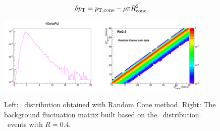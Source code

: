 \begin{equation}
\delta p_{\rm T} = p_{\rm T, cone} - \rho \pi R_{\rm cone}^{2}
\label{edeltapt}
\end{equation}

\begin{figure}[bth]
\centering
\includegraphics[width=0.45\textwidth]{pPbplots/ResponseMatrix/DeltaPt_Djet5Excl}
\includegraphics[width=0.45\textwidth]{pPbplots/ResponseMatrix/BkgMatrix_Djet5Excl}
\caption{Left: \deltapt\ distribution obtained with Random Cone method. Right: The background fluctuation matrix built based on the \deltapt\ distribution. \pPb\ events with $R=0.4$.}
\label{fig:DeltaPt}
\end{figure}

